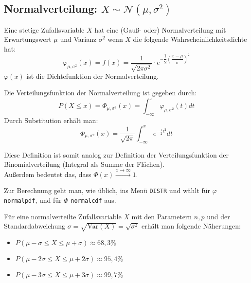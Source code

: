 \documentclass[main.tex]{subfiles}
\begin{document}
\subsection{Normalverteilung: $X \sim \mathcal{N}(\mu,\sigma^2)$}

\begin{Definition}
Eine stetige Zufallsvariable $X$ hat eine (Gauß- oder) Normalverteilung mit Erwartungswert $\mu$ und Varianz $\sigma ^{2}$ wenn $X$ die folgende Wahrscheinlichkeitsdichte hat:
$$\varphi_{\mu,\sigma^2} (x) = f(x) = \dfrac {1}{\sqrt {2\pi \sigma^2}} \cdot e^{- \dfrac{1}{2} \left( \dfrac{x-\mu}{\sigma} \right) ^2}$$
$\varphi(x)$ ist die Dichtefunktion der Normalverteilung.
\end{Definition}

\begin{Definition}
  Die Verteilungsfunktion der Normalverteilung ist gegeben durch:
  $$P(X\leq x) = \Phi_{\mu,\sigma^2}(x) = \int_{-\infty}^{x} \varphi_{\mu,\sigma^2}(t) dt$$
  Durch Substitution erhält man:
  $$\Phi_{\mu,\sigma^2}(x) = \dfrac{1}{\sqrt{2\pi}}\int_{-\infty}^{x} e^{-\frac{1}{2}t^2} dt$$
\end{Definition}

\begin{Bemerkung}
  Diese Definition ist somit analog zur Definition der Verteilungsfunktion der Binomialverteilung (Integral als Summe der Flächen).\\
  Außerdem bedeutet das, dass $\Phi(x)  \xrightarrow{\scriptscriptstyle x\rightarrow \infty} 1$.
\end{Bemerkung}

\begin{GTR-Tipp}
  Zur Berechnung geht man, wie üblich, ins Menü \texttt{DISTR} und wählt für $\varphi$  \texttt{normalpdf}, und für $\Phi$  \texttt{normalcdf} aus.
\end{GTR-Tipp}

\begin{Theorem}
  Für eine normalverteilte Zufallsvariable $X$ mit den Parametern $n,p$ und der Standardabweichung $\sigma = \sqrt{\text{Var}(X)} = \sqrt{\sigma^2}$ erhält man folgende Näherungen:
  \begin{itemize}
    \item $P(\mu - \sigma \leq X \leq \mu + \sigma) \approx 68,3\%$
    \item $P(\mu - 2\sigma \leq X \leq \mu + 2\sigma) \approx 95,4\%$
    \item $P(\mu - 3\sigma \leq X \leq \mu + 3\sigma) \approx 99,7\%$
  \end{itemize}
\end{Theorem}
\end{document}
